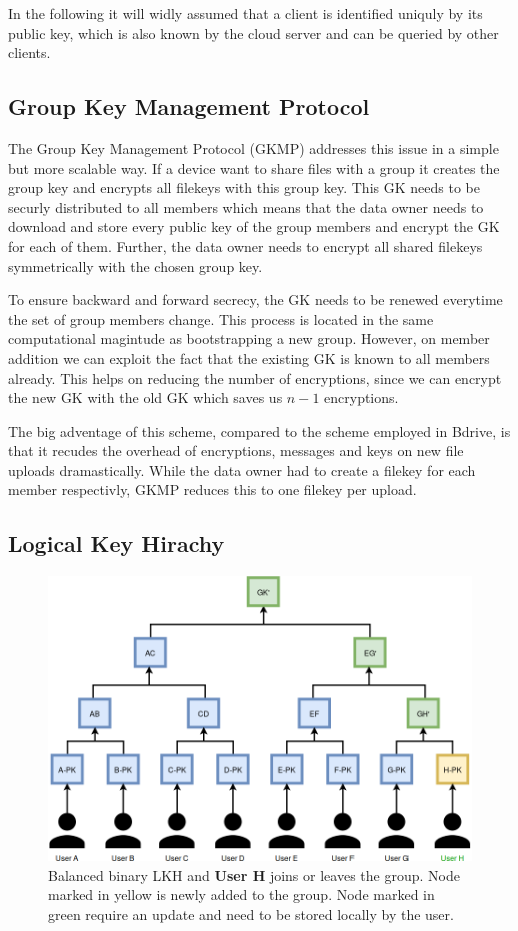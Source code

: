 In the following it will widly assumed that a client is identified uniquly by its public key, which is also known by the cloud server and can be queried by other clients. 

\subsection{Group Key Management Protocol}
The Group Key Management Protocol (GKMP)\cite{harney1997group} addresses this issue in a simple but more scalable way. If a device want to share files with a group it creates the group key and encrypts all filekeys with this group key. This GK needs to be securly distributed to all members which means that the data owner needs to download and store every public key of the group members and encrypt the GK for each of them. Further, the data owner needs to encrypt all shared filekeys symmetrically with the chosen group key. 

To ensure backward and forward secrecy, the GK needs to be renewed everytime the set of group members change. This process is located in the same computational magintude as bootstrapping a new group. However, on member addition we can exploit the fact that the existing GK is known to all members already. This helps on reducing the number of encryptions, since we can encrypt the new GK with the old GK which saves us $n-1$ encryptions.  

The big adventage of this scheme, compared to the scheme employed in Bdrive, is that it recudes the overhead of encryptions, messages and keys on new file uploads dramastically. While the data owner had to create a filekey for each member respectivly, GKMP reduces this to one filekey per upload.  

\subsection{Logical Key Hirachy}
\begin{figure}[!ht]
\centering
    \includegraphics[width=0.8\linewidth]{img/LKH.png}
    \caption{Balanced binary LKH and \textbf{User H} joins or leaves the group. Node marked in yellow is newly added to the group. Node marked in green require an update and need to be stored locally by the user.}
    \label{fig:lkh}
\end{figure}

